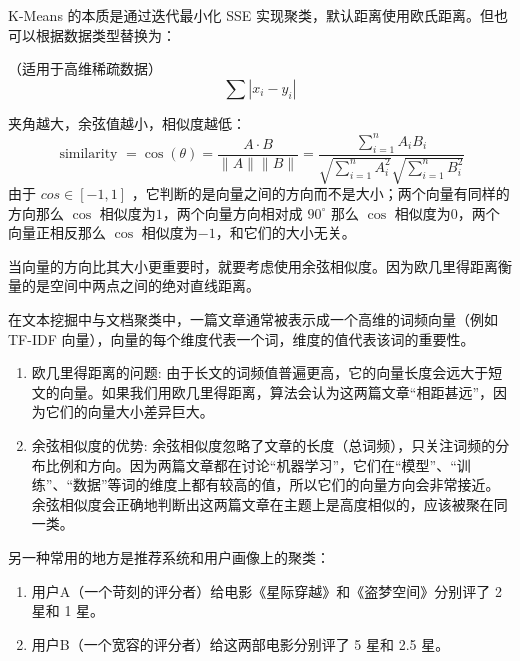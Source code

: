 K-Means 的本质是通过迭代最小化 SSE 实现聚类，默认距离使用欧氏距离。但也可以根据数据类型替换为：

\begin{definition}[曼哈顿距离]
    （适用于高维稀疏数据）
    $$\sum\left|x_i-y_i\right|$$
\end{definition}

\begin{definition}[余弦相似度]
    夹角越大，余弦值越小，相似度越低：
    $$
        \text { similarity }=\cos (\theta)=\frac{A \cdot B}{\|A\|\|B\|}=\frac{\sum_{i=1}^n A_i B_i}{\sqrt{\sum_{i=1}^n A_i^2} \sqrt{\sum_{i=1}^n B_i^2}}
    $$
    由于 $cos \in [-1,1]$ ，它判断的是向量之间的方向而不是大小；两个向量有同样的方向那么 $\cos$ 相似度为$1$，两个向量方向相对成 $90^\circ$ 那么 $\cos$ 相似度为$0$，两个向量正相反那么 $\cos$ 相似度为$-1$，和它们的大小无关。

    当向量的方向比其大小更重要时，就要考虑使用余弦相似度。因为欧几里得距离衡量的是空间中两点之间的绝对直线距离。
\end{definition}

\begin{example}
    在文本挖掘中与文档聚类中，一篇文章通常被表示成一个高维的词频向量（例如 TF-IDF 向量），向量的每个维度代表一个词，维度的值代表该词的重要性。
\end{example}

\begin{solution}
    \begin{enumerate}
        \item 欧几里得距离的问题: 由于长文的词频值普遍更高，它的向量长度会远大于短文的向量。如果我们用欧几里得距离，算法会认为这两篇文章“相距甚远”，因为它们的向量大小差异巨大。
        \item 余弦相似度的优势: 余弦相似度忽略了文章的长度（总词频），只关注词频的分布比例和方向。因为两篇文章都在讨论“机器学习”，它们在“模型”、“训练”、“数据”等词的维度上都有较高的值，所以它们的向量方向会非常接近。余弦相似度会正确地判断出这两篇文章在主题上是高度相似的，应该被聚在同一类。
    \end{enumerate}
\end{solution}

\begin{example}
    另一种常用的地方是推荐系统和用户画像上的聚类：
    \begin{enumerate}
        \item 用户A（一个苛刻的评分者）给电影《星际穿越》和《盗梦空间》分别评了 2 星和 1 星。
        \item 用户B（一个宽容的评分者）给这两部电影分别评了 5 星和 2.5 星。
    \end{enumerate}
\end{example}


